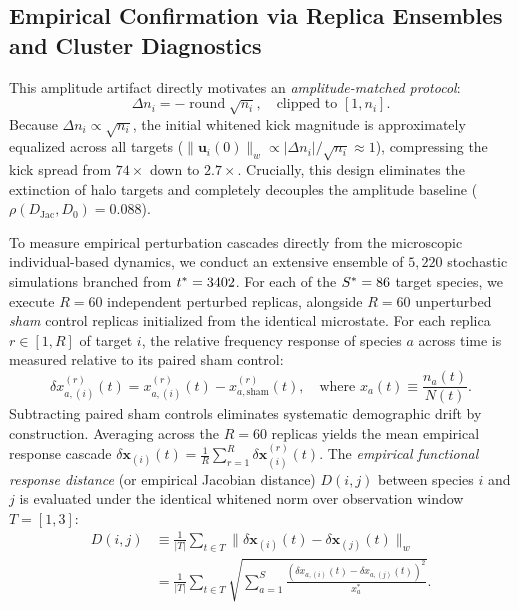 \documentclass[twocolumn,amsmath,amssymb,aps,pra,10pt,floatfix,nofootinbib]{revtex4-2}
\begin{document}
\subsection{Empirical Confirmation via Replica Ensembles and Cluster Diagnostics}

This amplitude artifact directly motivates an \textit{amplitude-matched protocol}:
\begin{equation}
\Delta n_i = -\operatorname{round}\sqrt{n_i}, \quad \text{clipped to } [1, n_i].
\label{eq:matched}
\end{equation}
Because $\Delta n_i \propto \sqrt{n_i}$, the initial whitened kick magnitude is approximately equalized across all targets ($\|\mathbf{u}_i(0)\|_w \propto |\Delta n_i|/\sqrt{n_i} \approx 1$), compressing the kick spread from $74\times$ down to $2.7\times$. Crucially, this design eliminates the extinction of halo targets and completely decouples the amplitude baseline ($\rho(D_{\text{Jac}}, D_0) = 0.088$).

To measure empirical perturbation cascades directly from the microscopic individual-based dynamics, we conduct an extensive ensemble of $5{,}220$ stochastic simulations branched from $t^* = 3402$. For each of the $S^* = 86$ target species, we execute $R = 60$ independent perturbed replicas, alongside $R = 60$ unperturbed \textit{sham} control replicas initialized from the identical microstate. For each replica $r \in [1, R]$ of target $i$, the relative frequency response of species $a$ across time is measured relative to its paired sham control:
\begin{equation}
\delta x_{a,(i)}^{(r)}(t) = x_{a,(i)}^{(r)}(t) - x_{a,\mathrm{sham}}^{(r)}(t), \quad \text{where } x_a(t) \equiv \frac{n_a(t)}{N(t)}.
\label{eq:delta_x}
\end{equation}
Subtracting paired sham controls eliminates systematic demographic drift by construction. Averaging across the $R = 60$ replicas yields the mean empirical response cascade $\delta\mathbf{x}_{(i)}(t) = \frac{1}{R} \sum_{r=1}^R \delta\mathbf{x}_{(i)}^{(r)}(t)$. The \textit{empirical functional response distance} (or empirical Jacobian distance) $D(i,j)$ between species $i$ and $j$ is evaluated under the identical whitened norm over observation window $T = [1, 3]$:
\begin{equation}
\begin{split}
D(i,j) &\equiv \frac{1}{|T|} \sum_{t \in T} \|\delta\mathbf{x}_{(i)}(t) - \delta\mathbf{x}_{(j)}(t)\|_w \\
&= \frac{1}{|T|} \sum_{t \in T} \sqrt{ \sum_{a=1}^S \frac{\left( \delta x_{a,(i)}(t) - \delta x_{a,(j)}(t) \right)^2}{x_a^*} }.
\end{split}
\label{eq:D_emp}
\end{equation}
\end{document}
